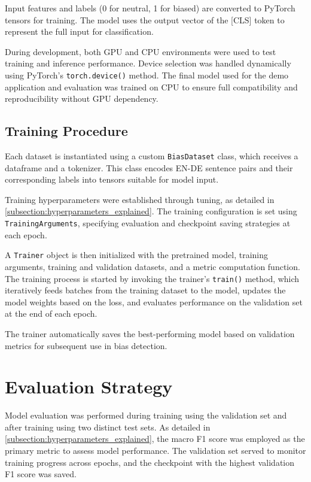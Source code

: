     Input features and labels (0 for neutral, 1 for biased) are converted to PyTorch tensors for training. The model uses the output vector of the [CLS] token to represent the full input for classification.

    During development, both GPU and CPU environments were used to test training and inference performance. Device selection was handled dynamically using PyTorch’s \texttt{torch.device()} method. The final model used for the demo application and evaluation was trained on CPU to ensure full compatibility and reproducibility without GPU dependency.

\subsection{Training Procedure}
    Each dataset is instantiated using a custom \texttt{BiasDataset} class, which receives a dataframe and a tokenizer. This class encodes EN-DE sentence pairs and their corresponding labels into tensors suitable for model input.

    Training hyperparameters were established through tuning, as detailed in \autoref{subsection:hyperparameters_explained}. The training configuration is set using \texttt{TrainingArguments}, specifying evaluation and checkpoint saving strategies at each epoch.

    A \texttt{Trainer} object is then initialized with the pretrained model, training arguments, training and validation datasets, and a metric computation function. The training process is started by invoking the trainer's \texttt{train()} method, which iteratively feeds batches from the training dataset to the model, updates the model weights based on the loss, and evaluates performance on the validation set at the end of each epoch.

    The trainer automatically saves the best-performing model based on validation metrics for subsequent use in bias detection.

\section{Evaluation Strategy}
    Model evaluation was performed during training using the validation set and after training using two distinct test sets. As detailed in \autoref{subsection:hyperparameters_explained}, the macro F1 score was employed as the primary metric to assess model performance. The validation set served to monitor training progress across epochs, and the checkpoint with the highest validation F1 score was saved.

